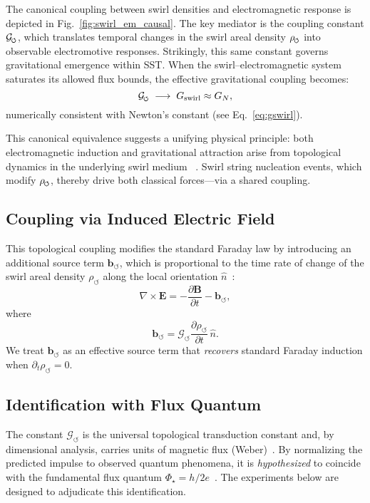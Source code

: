 \documentclass[10pt,reprint,aps,onecolumn,nofootinbib]{revtex4-2}
\newcommand{\vect}[1]{\boldsymbol{#1}} %
\newcommand{\EE}{\vect{E}}
\newcommand{\BB}{\vect{B}}
\begin{document}
        The canonical coupling between swirl densities and electromagnetic response is depicted in Fig.~\ref{fig:swirl_em_causal}. The key mediator is the coupling constant \( \mathcal{G}_{\mkern-2mu\scriptscriptstyle\boldsymbol{\circlearrowleft}} \), which translates temporal changes in the swirl areal density \( \rho_{\mkern-2mu\scriptscriptstyle\boldsymbol{\circlearrowleft}} \) into observable electromotive responses. Strikingly, this same constant governs gravitational emergence within SST. When the swirl–electromagnetic system saturates its allowed flux bounds, the effective gravitational coupling becomes:
        \[
            \mathcal{G}_{\mkern-2mu\scriptscriptstyle\boldsymbol{\circlearrowleft}} \;\longrightarrow\; G_{\mathrm{swirl}} \approx G_N,
        \]
        numerically consistent with Newton’s constant (see Eq.~\ref{eq:gswirl}).

        This canonical equivalence suggests a unifying physical principle: both electromagnetic induction and gravitational attraction arise from topological dynamics in the underlying swirl medium~ \cite{EM_G}. Swirl string nucleation events, which modify \(\rho_{\mkern-2mu\scriptscriptstyle\boldsymbol{\circlearrowleft}}\), thereby drive both classical forces—via a shared coupling.

    \subsection*{Coupling via Induced Electric Field}
        This topological coupling modifies the standard Faraday law by introducing an additional source term $\vect{b}_{\circlearrowleft}$, which is proportional to the time rate of change of the swirl areal density $\rho_{\circlearrowleft}$ along the local orientation $\hat{n}$~\cite{EM_G}:
        \begin{equation} \label{eq:modfaraday}
            \nabla \times \EE = - \frac{\partial \BB}{\partial t} - \vect{b}_{\circlearrowleft},
        \end{equation}
        where
        \[
            \vect{b}_{\circlearrowleft} = \mathcal{G}_{\circlearrowleft} \frac{\partial \rho_{\circlearrowleft}}{\partial t} \,\hat{n}.
        \]
        We treat $\vect{b}_{\circlearrowleft}$ as an effective source term that \emph{recovers} standard Faraday induction when $\partial_t \rho_{\circlearrowleft}=0$.

    \subsection*{Identification with Flux Quantum}
        The constant $\mathcal{G}_{\circlearrowleft}$ is the universal topological transduction constant and, by dimensional analysis, carries units of magnetic flux (Weber)~\cite{EM_G}. By normalizing the predicted impulse to observed quantum phenomena, it is \emph{hypothesized} to coincide with the fundamental flux quantum $\Phi_\star=h/2e$~\cite{EM_G}. The experiments below are designed to adjudicate this identification.
\end{document}
